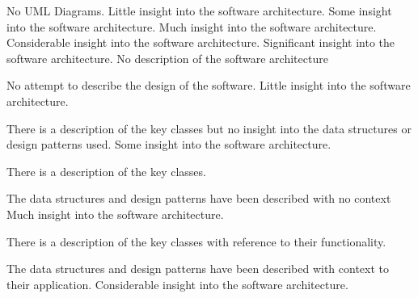 \documentclass{../../fal_assignment}
\begin{document}
\begin{markingrubric}
	\grade\fail No UML Diagrams.
	\grade Little insight into the software architecture.
	\grade Some insight into the software architecture.
	\grade Much insight into the software architecture.
	\grade Considerable insight into the software architecture.
	\grade Significant insight into the software architecture.
	\grade\fail No description of the software architecture
	\par No attempt to describe the design of the software.
	\grade Little insight into the software architecture.
	\par There is a description of the key classes but no insight into the data structures or design patterns used.
	\grade Some insight into the software architecture.
	\par There is a description of the key classes.
	\par The data structures and design patterns have been described with no context
	\grade Much insight into the software architecture.
	\par There is a description of the key classes with reference to their functionality.
	\par The data structures and design patterns have been described with context to their application.
	\grade Considerable insight into the software architecture.

\end{markingrubric}
\end{document}
